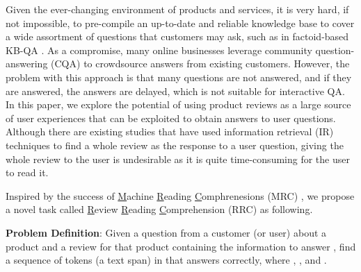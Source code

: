 \documentclass[11pt,a4paper]{article}
\begin{document}
Given the ever-changing environment of products and services, it is very hard, if not impossible, to pre-compile an up-to-date and reliable knowledge base to cover a wide assortment of questions that customers may ask, such as in factoid-based KB-QA \cite{xu2016question,fader2014open,kwok2001scaling,yin2015neural}.
As a compromise, many online businesses leverage community question-answering (CQA) \cite{mcauley2016addressing} to crowdsource answers from existing customers. However, the problem with this approach is that many questions are not answered, and if they are answered, the answers are delayed, which is not suitable for interactive QA.
In this paper, we explore the potential of using product reviews as a large source of user experiences that can be exploited to obtain answers to user questions. Although there are existing studies that have used information retrieval (IR) techniques \cite{mcauley2016addressing,yu2018aware} to find a whole review as the response to a user question, giving the whole review to the user is undesirable as it is quite time-consuming for the user to read it.

Inspired by the success of \underline{M}achine \underline{R}eading \underline{C}omphrenesions (MRC) \cite{rajpurkar2016squad,rajpurkar2018know}, we propose a novel task called \underline{R}eview \underline{R}eading \underline{C}omprehension (RRC) as following.

\textbf{Problem Definition}: Given a question  from a customer (or user) about a product and a review  for that product containing the information to answer , find a sequence of tokens (a text span)  in  that answers  correctly, where , , and .
\end{document}
